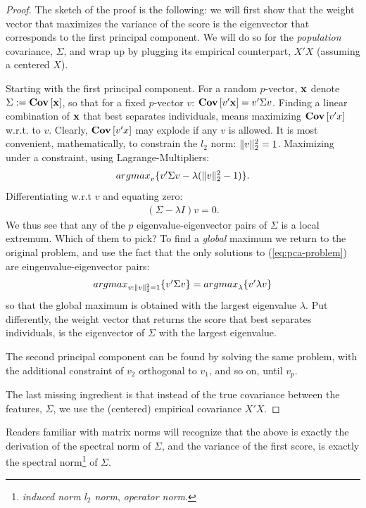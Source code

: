 \documentclass[12pt,a4paper]{article}
\begin{document}
\begin{proof}
	The sketch of the proof is the following: 
	we will first show that the weight vector that maximizes the variance of the score is the eigenvector that corresponds to the first principal component.
	We will do so for the \emph{population} covariance, $\Sigma$, and wrap up by plugging its empirical counterpart, $X'X$ (assuming a centered $X$). 
		
	Starting with the first principal component.
	For a random $p$-vector, $\mathbf{x}$ denote $\Sigma:=\mathbf{Cov} \left[ \mathbf{x} \right]$, so that for a fixed $p$-vector $v$: $\mathbf{Cov} \left[ v'\mathbf{x} \right]=v' \Sigma v$.
	Finding a linear combination of $\mathbf{x}$ that best separates individuals, means maximizing $\mathbf{Cov} \left[ v'x \right]$
	w.r.t. to $v$.
	Clearly, $\mathbf{Cov} \left[ v'x \right]$ may explode if any $v$ is allowed. 
	It is most convenient, mathematically, to constrain the $l_2$ norm: $\Vert v \Vert_2^2=1$.
	Maximizing under a constraint, using Lagrange-Multipliers: 
	\begin{align}
	\label{eq:pca-problem}
		\textstyle{\mathop{argmax}_{v}}\{ v' \Sigma v - \lambda (\Vert v \Vert_2^2-1) \}.
	\end{align}
	Differentiating w.r.t $v$ and equating zero: 
	\begin{align}
	(\Sigma- \lambda I) v = 0.
	\end{align}
	We thus see that any of the $p$ eigenvalue-eigenvector pairs of $\Sigma$ is a local extremum. 
	Which of them to pick?
	To find a \emph{global} maximum we return to the original problem, and use the fact that the only solutions to (\ref{eq:pca-problem}) are eingenvalue-eigenvector pairs:
	\begin{align}
	\label{eq:pca_maximal_variance}
	\textstyle{\mathop{argmax}_{v:\Vert v \Vert_2^2=1}}\{ v' \Sigma v  \}=\textstyle{\mathop{argmax}_{\lambda}}\{ v' \lambda v  \}
	\end{align}
	so that the global maximum is obtained with the largest eigenvalue $\lambda$.
	Put differently, the weight vector that returns the score that best separates individuals, is the eigenvector of $\Sigma$ with the largest eigenvalue. 
	
	The second principal component can be found by solving the same problem, with the additional constraint of $v_2$ orthogonal to $v_1$, and so on, until $v_p$. 
	
	The last missing ingredient is that instead of the true covariance between the features, $\Sigma$, we use the (centered) empirical covariance $X'X$.
\end{proof}


\begin{remark}
Readers familiar with matrix norms will recognize that the above is exactly the derivation of the spectral norm of $\Sigma$, and the variance of the first score, is exactly the spectral norm\footnote{\Aka \emph{induced norm $l_2$ norm}, \emph{operator norm}.} of $\Sigma$.
\end{remark}
\end{document}
